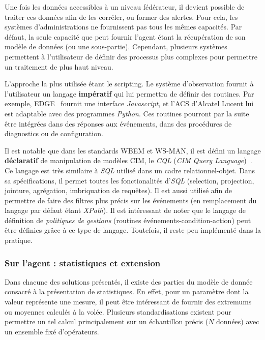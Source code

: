 Une fois les données accessibles à un niveau fédérateur, il devient possible de traiter ces données afin de les corréler, ou former des alertes. Pour cela, les systèmes d'administrations ne fournissent pas tous les mêmes capacités. Par défaut, la seule capacité que peut fournir l'agent étant la récupération de son modèle de données (ou une sous-partie). Cependant, plusieurs systèmes permettent à l'utilisateur de définir des processus plus complexes pour permettre un traitement de plus haut niveau.

L'approche la plus utilisée étant le scripting. Le système d'observation fournit à l'utilisateur un langage \textbf{impératif} qui lui permettra de définir des routines. Par exemple, EDGE~\cite{Motorola:EDGE} fournit une interface \textit{Javascript}, et l'ACS d'Alcatel Lucent lui est adaptable avec des programmes \textit{Python}. Ces routines pourront par la suite être intégrées dans des réponses aux événements, dans des procédures de diagnostics ou de configuration.

Il est notable que dans les standards WBEM et WS-MAN, il est défini un langage \textbf{déclaratif} de manipulation de modèles CIM, le \textit{CQL} (\textit{CIM Query Language})~\cite{DMTF:CIM-QL}. Ce langage est très similaire à \textit{SQL} utilisé dans un cadre relationnel-objet. Dans sa spécifications, il permet toutes les fonctionalités d'\textit{SQL} (selection, projection, jointure, agrégation, imbriquation de requêtes). Il est aussi utilisé afin de permettre de faire des filtres plus précis sur les événements (en remplacement du langage par défaut étant \textit{XPath}). Il est intéressant de noter que le langage de définition de \textit{politiques de gestions} (routines événements-condition-action) peut être définies grâce à ce type de langage. Toutefois, il reste peu implémenté dans la pratique.

\subsubsection{Sur l'agent : statistiques et extension}
Dans chacune des solutions présentés, il existe des parties du modèle de donnée consacré à la présentation de statistiques. En effet, pour un paramètre dont la valeur représente une mesure, il peut être intéressant de fournir des extremums ou moyennes calculés à la volée. Plusieurs standardisations existent pour permettre un tel calcul principalement sur un échantillon précis ($N$ données) avec un ensemble fixé d'opérateurs.

